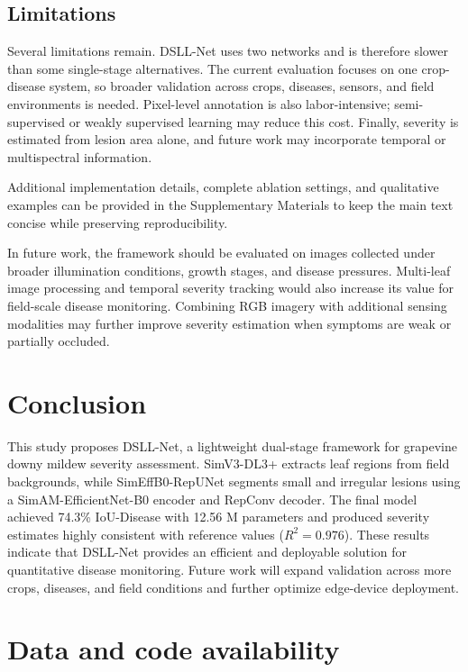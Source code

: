 \documentclass[
]{article}
\begin{document}
\hypertarget{limitations}{%
\subsection{Limitations}\label{limitations}}

Several limitations remain. DSLL-Net uses two networks and is therefore
slower than some single-stage alternatives. The current evaluation
focuses on one crop-disease system, so broader validation across crops,
diseases, sensors, and field environments is needed. Pixel-level
annotation is also labor-intensive; semi-supervised or weakly supervised
learning may reduce this cost. Finally, severity is estimated from lesion
area alone, and future work may incorporate temporal or multispectral
information.

Additional implementation details, complete ablation settings, and
qualitative examples can be provided in the Supplementary Materials to
keep the main text concise while preserving reproducibility.

In future work, the framework should be evaluated on images collected
under broader illumination conditions, growth stages, and disease
pressures. Multi-leaf image processing and temporal severity tracking
would also increase its value for field-scale disease monitoring.
Combining RGB imagery with additional sensing modalities may further
improve severity estimation when symptoms are weak or partially
occluded.

\hypertarget{conclusion}{%
\section{Conclusion}\label{conclusion}}

This study proposes DSLL-Net, a lightweight dual-stage framework for
grapevine downy mildew severity assessment. SimV3-DL3+ extracts leaf
regions from field backgrounds, while SimEffB0-RepUNet segments small
and irregular lesions using a SimAM-EfficientNet-B0 encoder and RepConv
decoder. The final model achieved 74.3\% IoU-Disease with 12.56 M
parameters and produced severity estimates highly consistent with
reference values (\(R^{2}=0.976\)). These results indicate that DSLL-Net
provides an efficient and deployable solution for quantitative disease
monitoring. Future work will expand validation across more crops,
diseases, and field conditions and further optimize edge-device
deployment.

\hypertarget{data-and-code-availability}{%
\section*{Data and code availability}\label{data-and-code-availability}}
\end{document}
